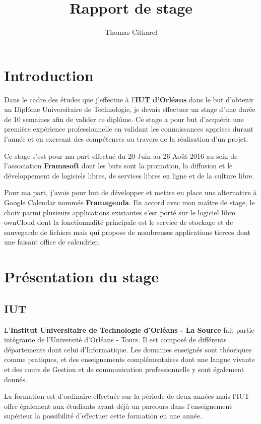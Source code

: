 \documentclass[10pt,a4paper]{report}
\author{Thomas Citharel}
\title{Rapport de stage}
\begin{document}
	\maketitle
	\tableofcontents
	\chapter*{Introduction}
	Dans le cadre des études que j'effectue à l'\textbf{IUT d'Orléans} dans le but d'obtenir un Diplôme Universitaire de Technologie, je devais effectuer un stage d'une durée de 10 semaines afin de valider ce diplôme. Ce stage a pour but d'acquérir une première expérience professionnelle en validant les connaissances apprises durant l'année et en exercant des compétences au travers de la réalisation d'un projet.
	
	Ce stage s'est pour ma part effectué du 20 Juin au 26 Août 2016 au sein de l'association \textbf{Framasoft} dont les buts sont la promotion, la diffusion et le développement de logiciels libres, de services libres en ligne et de la culture libre.
	
	Pour ma part, j'avais pour but de développer et mettre en place une alternative à Google Calendar nommée \textbf{Framagenda}. En accord avec mon maître de stage, le choix parmi plusieurs applications existantes s'est porté sur le logiciel libre ownCloud dont la fonctionnalité principale est le service de stockage et de sauvegarde de fichiers mais qui propose de nombreuses applications tierces dont une faisant office de calendrier.
	
	\chapter{Présentation du stage}
	\section{IUT}
	L'\textbf{Institut Universitaire de Technologie d'Orléans - La Source} fait partie intégrante de l'Université d'Orléans - Tours. Il est composé de différents départements dont celui d'Informatique. Les domaines enseignés sont théoriques comme pratiques, et des enseignements complémentaires dont une langue vivante et des cours de Gestion et de communication professionnelle y sont également donnés.
	
	La formation est d'ordinaire effectuée sur la période de deux années mais l'IUT offre également aux étudiants ayant déjà un parcours dans l'enseignement supérieur la possibilité d'effectuer cette formation en une année.
	
\end{document}
